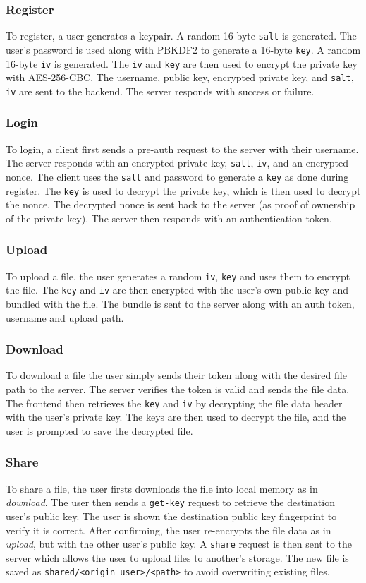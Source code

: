 \documentclass{article}
\begin{document}
\subsubsection{Register}
To register, a user generates a keypair. A random 16-byte \texttt{salt} is generated. The user's password is used along with PBKDF2 to generate a 16-byte \texttt{key}. A random 16-byte \texttt{iv} is generated. The \texttt{iv} and \texttt{key} are then used to encrypt the private key with AES-256-CBC\cite{aes}. The username, public key, encrypted private key, and \texttt{salt}, \texttt{iv} are sent to the backend. The server responds with success or failure.

\subsubsection{Login}
To login, a client first sends a pre-auth request to the server with their username. The server responds with an encrypted private key, \texttt{salt}, \texttt{iv}, and an encrypted nonce. The client uses the \texttt{salt} and password to generate a \texttt{key} as done during register. The \texttt{key} is used to decrypt the private key, which is then used to decrypt the nonce. The decrypted nonce is sent back to the server (as proof of ownership of the private key). The server then responds with an authentication token.

\subsubsection{Upload}
To upload a file, the user generates a random \texttt{iv}, \texttt{key} and uses them to encrypt the file. The \texttt{key} and \texttt{iv} are then encrypted with the user's own public key and bundled with the file. The bundle is sent to the server along with an auth token, username and upload path.

\subsubsection{Download}
To download a file the user simply sends their token along with the desired file path to the server. The server verifies the token is valid and sends the file data. The frontend then retrieves the \texttt{key} and \texttt{iv} by decrypting the file data header with the user's private key. The keys are then used to decrypt the file, and the user is prompted to save the decrypted file.

\subsubsection{Share}
To share a file, the user firsts downloads the file into local memory as in \emph{download}. The user then sends a \texttt{get-key} request to retrieve the destination user's public key. The user is shown the destination public key fingerprint to verify it is correct. After confirming, the user re-encrypts the file data as in \emph{upload}, but with the other user's public key. A \texttt{share} request is then sent to the server which allows the user to upload files to another's storage. The new file is saved as \texttt{shared/<origin\_user>/<path>} to avoid overwriting existing files.
\end{document}
